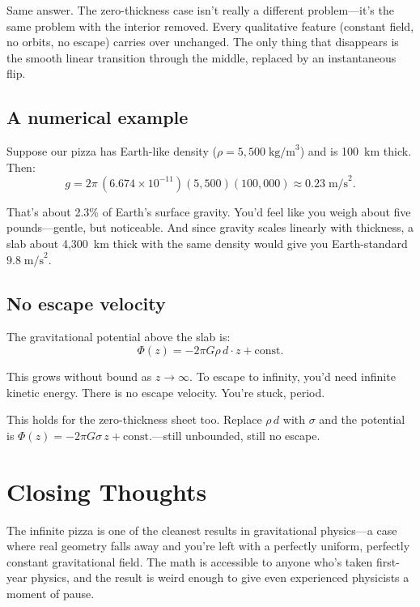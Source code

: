 \documentclass[11pt, letterpaper]{article}
\begin{document}
Same answer. The zero-thickness case isn't really a different problem---it's the same problem with the interior removed. Every qualitative feature (constant field, no orbits, no escape) carries over unchanged. The only thing that disappears is the smooth linear transition through the middle, replaced by an instantaneous flip.

\subsection{A numerical example}

Suppose our pizza has Earth-like density ($\rho = 5{,}500\;\text{kg/m}^3$) and is 100~km thick. Then:
\begin{equation}
  g = 2\pi \,(6.674 \times 10^{-11})(5{,}500)(100{,}000) \approx 0.23\;\text{m/s}^2.
\end{equation}

That's about 2.3\% of Earth's surface gravity. You'd feel like you weigh about five pounds---gentle, but noticeable. And since gravity scales linearly with thickness, a slab about 4{,}300~km thick with the same density would give you Earth-standard $9.8\;\text{m/s}^2$.

\subsection{No escape velocity}

The gravitational potential above the slab is:
\begin{equation}
  \Phi(z) = -2\pi G \rho\, d \cdot z + \text{const.}
\end{equation}

This grows without bound as $z \to \infty$. To escape to infinity, you'd need infinite kinetic energy. There is no escape velocity. You're stuck, period.

This holds for the zero-thickness sheet too. Replace $\rho\,d$ with $\sigma$ and the potential is $\Phi(z) = -2\pi G\sigma\, z + \text{const.}$---still unbounded, still no escape.


\section*{Closing Thoughts}

The infinite pizza is one of the cleanest results in gravitational physics---a case where real geometry falls away and you're left with a perfectly uniform, perfectly constant gravitational field. The math is accessible to anyone who's taken first-year physics, and the result is weird enough to give even experienced physicists a moment of pause.
\end{document}
